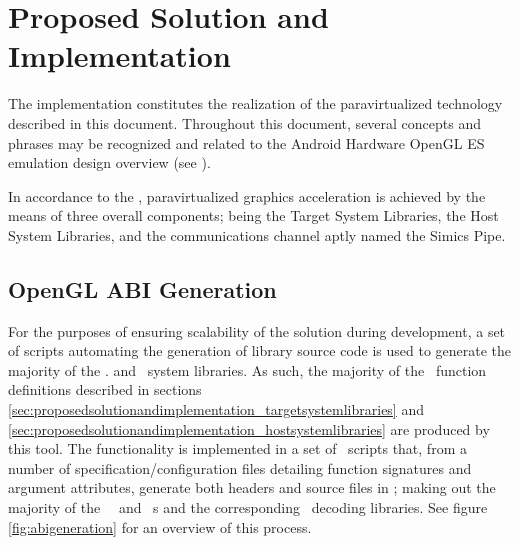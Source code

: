 
\chapter{Proposed Solution and Implementation}
\label{cha:proposedsolutionandimplementation}
The implementation constitutes the realization of the paravirtualized technology described in this document.
Throughout this document, several concepts and phrases may be recognized and related to the Android Hardware OpenGL ES emulation design overview (see ).

In accordance to the \dvttermandroidemulator , paravirtualized graphics acceleration is achieved by the means of three overall components; being the Target System Libraries, the Host System Libraries, and the communications channel aptly named the Simics Pipe.



\section{OpenGL ABI Generation}
\label{sec:proposedsolutionandimplementation_openglabigeneration}
For the purposes of ensuring scalability of the solution during development, a set of scripts automating the generation of library source code is used to generate the majority of the \dvttermtarget . and \dvttermhost\ system libraries.
As such, the majority of the \dvttermopengl\ function definitions described in sections \ref{sec:proposedsolutionandimplementation_targetsystemlibraries} and \ref{sec:proposedsolutionandimplementation_hostsystemlibraries} are produced by this tool.
The functionality is implemented in a set of \dvttermpython\ scripts that, from a number of specification/configuration files detailing function signatures and argument attributes, generate both headers and source files in \dvttermc ; making out the majority of the \dvttermtarget\ \dvttermopengl\ and \dvttermegl\ \dvttermabi s and the corresponding \dvttermhost\ decoding libraries.
See figure \ref{fig:abigeneration} for an overview of this process.




